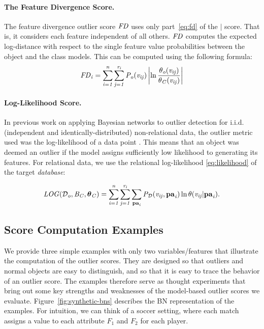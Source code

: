 {\paragraph{The Feature Divergence Score.}
The feature divergence outlier score $\it{FD}$ uses only part~\eqref{eq:fd} of the $\mid$ score. That is, it considers each feature independent of all others.  $\it{FD}$ computes the expected log-distance with respect to  the single feature value probabilities between the object and the class models. This can be computed using the following formula:
\begin{equation}
\it{FD}_{i}	=\sum_{i=1}^{n}\sum_{j=1}^{r_{i}} P_{o}( v_{ij}) \left|\ln \frac{\theta_{o}( v_{ij})}{\theta_{C}( v_{ij})}\right|
\end{equation}


\paragraph{Log-Likelihood Score.} 

In previous work on applying Bayesian networks to outlier detection for i.i.d. (independent and identically-distributed) non-relational data, the outlier metric used was the log-likelihood of a data point \cite{Cansado2008}. This means that an object was deemed an outlier if the model assigns sufficiently low likelihood to generating its features. For relational data, we use the relational log-likelihood \eqref{eq:likelihood} of the target {\em database}:

\begin{equation} \label{eq:loglikelihood-score}
\it{LOG}(\mathcal{D}_{o},B_{C},\boldsymbol{\theta}_{C}) =   \sum_{i=1}^{n}\sum_{j=1}^{r_{i}} \sum_{\mathbf{pa}_{i}}P_{\mathcal{D}}(v_{ij},\mathbf{pa}_{i})\ln \theta(v_{ij}|\mathbf{pa}_{i}).
\end{equation}




\subsection{Score Computation Examples} \label{sec:divergence-examples} 
			
			
			We provide three simple examples with only two variables/features that illustrate the computation of the outlier scores. They are designed so that outliers and normal objects are easy to distinguish, and so that it is easy to trace the behavior of an outlier score.
			The examples therefore serve as thought experiments that bring out some key strengths and weaknesses of the model-based outlier scores we evaluate. 
			Figure~\ref{fig:synthetic-bns} describes the BN representation of the examples. For intuition, we can think of a soccer setting, where each match assigns a value to each attribute $F_{1}$ and $F_{2}$ for each player. 
			
}
